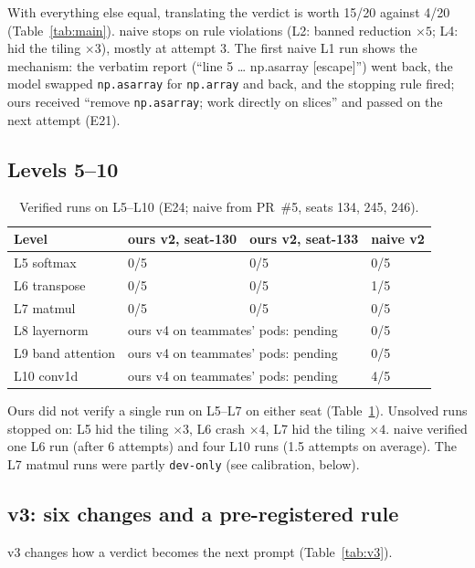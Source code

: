 \documentclass[11pt]{article}
\newcommand{\code}[1]{\texttt{#1}}
\newcommand{\E}[1]{E#1}
\begin{document}
With everything else equal, translating the verdict is worth 15/20 against 4/20 (Table~\ref{tab:main}).
naive stops on rule violations (L2: banned reduction $\times5$; L4: hid the tiling $\times3$), mostly at
attempt 3. The first naive L1 run shows the mechanism: the verbatim report (``line 5 \dots{} np.asarray
[escape]'') went back, the model swapped \code{np.asarray} for \code{np.array} and back, and the stopping
rule fired; ours received ``remove \code{np.asarray}; work directly on slices'' and passed on the next
attempt (\E{21}).

\subsection{Levels 5--10}

\begin{table}[h]
\centering
\begin{tabular}{@{}llll@{}}
\toprule
Level & ours v2, seat-130 & ours v2, seat-133 & naive v2 \\
\midrule
L5 softmax & 0/5 & 0/5 & 0/5 \\
L6 transpose & 0/5 & 0/5 & 1/5 \\
L7 matmul & 0/5 & 0/5 & 0/5 \\
L8 layernorm & \multicolumn{2}{l}{ours v4 on teammates' pods: pending} & 0/5 \\
L9 band attention & \multicolumn{2}{l}{ours v4 on teammates' pods: pending} & 0/5 \\
L10 conv1d & \multicolumn{2}{l}{ours v4 on teammates' pods: pending} & 4/5 \\
\bottomrule
\end{tabular}
\caption{Verified runs on L5--L10 (\E{24}; naive from PR~\#5, seats 134, 245, 246).}
\label{tab:l510}
\end{table}

Ours did not verify a single run on L5--L7 on either seat (Table~\ref{tab:l510}). Unsolved runs stopped
on: L5 hid the tiling $\times3$, L6 crash $\times4$, L7 hid the tiling $\times4$. naive verified one L6
run (after 6 attempts) and four L10 runs (1.5 attempts on average). The L7 matmul runs were partly \code{dev-only} (see calibration, below).

\subsection{v3: six changes and a pre-registered rule}
v3 changes how a verdict becomes the next prompt (Table~\ref{tab:v3}).
\end{document}
